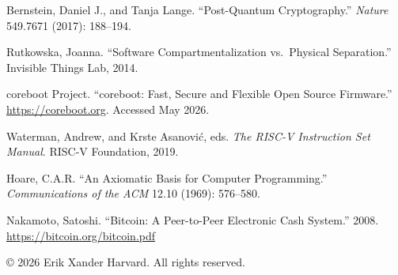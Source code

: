 \documentclass[11pt, oneside]{article}
\begin{document}
\begin{description}[leftmargin=1.4em, labelindent=0pt, itemsep=4pt,
                    parsep=0pt, font=\normalfont]
\item Bernstein, Daniel J., and Tanja Lange. ``Post-Quantum
      Cryptography.'' \textit{Nature} 549.7671 (2017): 188--194.

\item Rutkowska, Joanna. ``Software Compartmentalization vs.\ Physical
      Separation.'' Invisible Things Lab, 2014.

\item coreboot Project. ``coreboot: Fast, Secure and Flexible Open
      Source Firmware.'' \url{https://coreboot.org}. Accessed May 2026.

\item Waterman, Andrew, and Krste Asanovi\'c, eds. \textit{The RISC-V
      Instruction Set Manual}. RISC-V Foundation, 2019.

\item Hoare, C.A.R. ``An Axiomatic Basis for Computer Programming.''
      \textit{Communications of the ACM} 12.10 (1969): 576--580.

\item Nakamoto, Satoshi. ``Bitcoin: A Peer-to-Peer Electronic Cash
      System.'' 2008.\\
      \url{https://bitcoin.org/bitcoin.pdf}

\end{description}

\vspace{2em}
\begin{center}
\small\textcolor{LogosGray}{\copyright{} 2026 Erik Xander Harvard. All rights reserved.}
\end{center}

\end{document}
